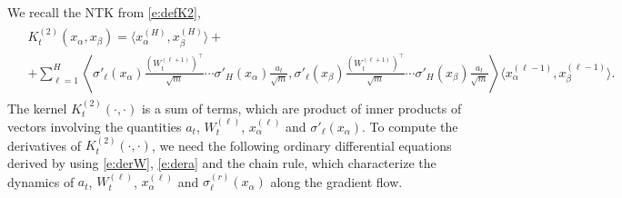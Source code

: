 \documentclass{article}
\numberwithin{equation}{section}
\newcommand{\al}{\alpha}
\newcommand{\1}{\mathds{1}}
\theoremstyle{plain} %
\begin{document}
We recall the NTK from \eqref{e:defK2}, \begin{align*}\begin{split}
& K^{(2)}_t(x_\al,x_\beta)= \langle x_\al^{(H)}, x_\beta^{(H)}\rangle+\\
&+ \sum_{\ell=1}^H   \left\langle
\sigma'_\ell(x_\al)\frac{(W_t^{(\ell+1)})^\top}{\sqrt m}\cdots \sigma'_{H}(x_\al)\frac{a_t}{\sqrt m}, \sigma'_\ell(x_\beta)\frac{(W_t^{(\ell+1)})^\top}{\sqrt m}\cdots \sigma'_{H}(x_\beta)\frac{a_t}{\sqrt m}  \right\rangle \langle x^{(\ell-1)}_\al, x^{(\ell-1)}_\beta \rangle.
\end{split}\end{align*}
The kernel $K_t^{(2)}(\cdot, \cdot)$ is a sum of terms, which are product of inner products of vectors involving the quantities $a_t$, $W_t^{(\ell)}$, $x^{(\ell)}_\al$ and $\sigma'_\ell(x_\al)$. To compute the derivatives of $K_t^{(2)}(\cdot, \cdot)$, we need the following ordinary differential equations derived by using \eqref{e:derW}, \eqref{e:dera} and the chain rule, which characterize the dynamics of 
$a_t$, $W_t^{(\ell)}$, $x^{(\ell)}_\al$ and $\sigma_\ell^{(r)}(x_\al)$ along the gradient flow.
\end{document}

